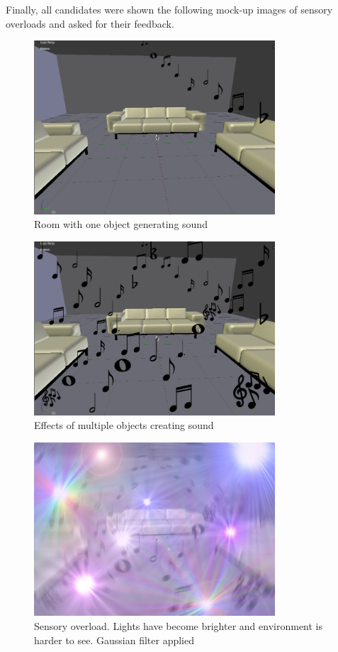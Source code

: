 \documentclass[11pt]{report}
\begin{document}
Finally, all candidates were shown the following mock-up images of sensory overloads and asked for their feedback. 

\begin{figure}[H]
\centering
\includegraphics[width=90mm]{images/design/GD_basic.jpg}
\caption{Room with one object generating sound}
\label{sensorymockup1}
\end{figure}

\begin{figure}[H]
\centering
\includegraphics[width=90mm]{images/design/GD_moresound.jpg}
\caption{Effects of multiple objects creating sound}
\label{sensorymockup2}
\end{figure}

\begin{figure}[H]
\centering
\includegraphics[width=90mm]{images/design/GD_overload.jpg}
\caption{Sensory overload. Lights have become brighter and environment is harder to see. Gaussian filter applied}
\label{sensorymockup3}
\end{figure}
\end{document}
